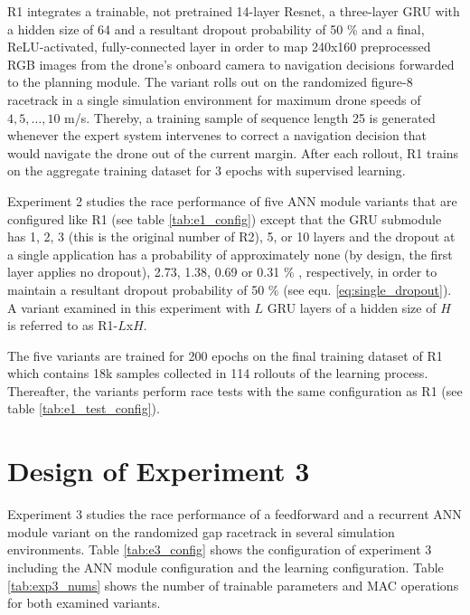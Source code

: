 R1 integrates
a trainable, not pretrained 14-layer Resnet, 
a three-layer GRU with a hidden size of 64
and a resultant dropout probability of 50 \%
and a final, ReLU-activated, fully-connected layer 
in order to map 240x160 preprocessed RGB images
from the drone's onboard camera
to navigation decisions forwarded to the planning module.
The variant rolls out on the randomized figure-8 racetrack
in a single simulation environment
for maximum drone speeds of $4,5,\dots,10$ m/s.
Thereby, a training sample of sequence length 25 
is generated whenever the expert system intervenes
to correct a navigation decision that would navigate
the drone out of the current margin.
After each rollout, R1 trains on
the aggregate training dataset 
for 3 epochs with supervised learning.



Experiment 2 studies the race performance
of five ANN module variants
that are configured like R1
(see table \ref{tab:e1_config})
except that the GRU submodule has
1, 2, 3 (this is the original number of R2), 5, or 10 layers
and the dropout at a single application
has a probability of approximately
none (by design, the first layer applies no dropout), 
2.73, 1.38, 0.69 or 0.31 \%
, respectively,
in order to maintain
a resultant dropout probability of 50 \%
(see equ. \ref{eq:single_dropout}).
A variant examined in this experiment 
with $L$ GRU layers
of a hidden size of $H$
is referred to as R1-$L$x$H$.

The five variants are trained for
200 epochs on 
the final training dataset of R1
which contains 18k samples collected in 114 rollouts
of the learning process.
Thereafter, the variants perform
race tests with the same
configuration as R1 (see table \ref{tab:e1_test_config}).





\section{Design of Experiment 3}
Experiment 3 studies the race performance of a
feedforward and a recurrent ANN module variant
on the randomized gap racetrack in several
simulation environments.
Table \ref{tab:e3_config} shows the configuration of experiment 3
including the ANN module configuration
and the learning configuration.
Table \ref{tab:exp3_nums} shows the number of trainable parameters
and MAC operations for both examined variants.

